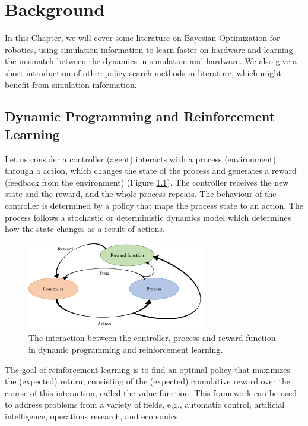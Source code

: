 \chapter{Background}
\label{chap:back}

In this Chapter, we will cover some literature on Bayesian Optimization for robotics, using simulation information to learn faster on hardware and learning the mismatch between the dynamics in simulation and hardware. We also give a short introduction of other policy search methods in literature, which might benefit from simulation information.


\section{Dynamic Programming and Reinforcement Learning}
\label{sec:dp}

Let us consider a controller (agent) interacts with a process (environment) through a action, which changes the state of the process and generates a reward (feedback from the environment) (Figure \ref{fig:rl}). The controller receives the new state and the reward, and the whole process repeats. The behaviour of the controller is determined by a policy that maps the process state to an action. The process follows a stochastic or deterministic dynamics model which determines how the state changes as a result of actions. 

\begin{figure}[t]
    \centering
    \includegraphics[width=0.7\textwidth]{img/reinforcementLearning.png}
    \caption{The interaction between the controller, process and reward function in dynamic programming and reinforcement learning.}
    \label{fig:rl}
\end{figure}
The goal of reinforcement learning is to find an optimal policy that maximizes the (expected) return, consisting of the (expected) cumulative reward over the course of this interaction, called the value function. This framework can be used to address problems from a variety of fields, e.g., automatic control, artificial intelligence, operations research, and economics.

